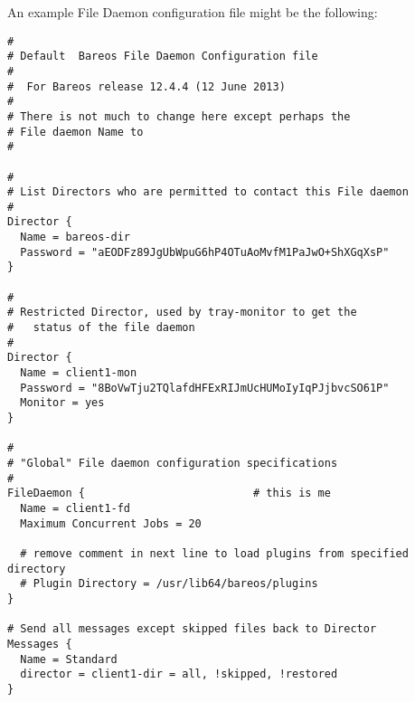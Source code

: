 An example File Daemon configuration file might be the following:

\footnotesize
\begin{verbatim}
#
# Default  Bareos File Daemon Configuration file
#
#  For Bareos release 12.4.4 (12 June 2013)
#
# There is not much to change here except perhaps the
# File daemon Name to
#

#
# List Directors who are permitted to contact this File daemon
#
Director {
  Name = bareos-dir
  Password = "aEODFz89JgUbWpuG6hP4OTuAoMvfM1PaJwO+ShXGqXsP"
}

#
# Restricted Director, used by tray-monitor to get the
#   status of the file daemon
#
Director {
  Name = client1-mon
  Password = "8BoVwTju2TQlafdHFExRIJmUcHUMoIyIqPJjbvcSO61P"
  Monitor = yes
}

#
# "Global" File daemon configuration specifications
#
FileDaemon {                          # this is me
  Name = client1-fd
  Maximum Concurrent Jobs = 20

  # remove comment in next line to load plugins from specified directory
  # Plugin Directory = /usr/lib64/bareos/plugins
}

# Send all messages except skipped files back to Director
Messages {
  Name = Standard
  director = client1-dir = all, !skipped, !restored
}
\end{verbatim}
\normalsize
